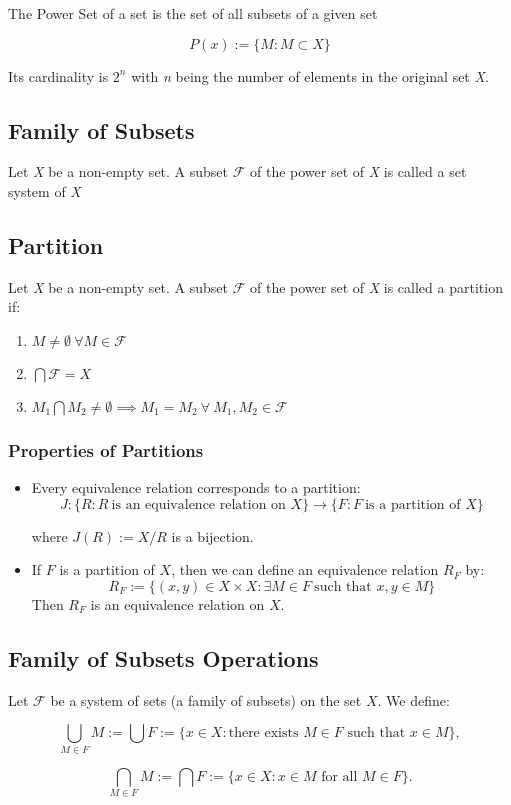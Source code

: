The Power Set of a set is the set of all subsets of a given set 

\[
	P(x):= \{ M: M \subset X\}
\]

Its cardinality is \(2^n\) with \emph{n} being the number of elements in the original set \emph{X}.

\subsection{Family of Subsets}

Let \emph{X} be a non-empty set. A subset \(\mathscr{F}\) of the power set of \emph{X} is called a set system of \emph{X}

\subsection{Partition}

Let \emph{X} be a non-empty set. A subset \(\mathscr{F}\) of the power set of \emph{X} is called a partition if:

\begin{enumerate}
	\item \(M \neq  \emptyset\ \forall M \in \mathscr{F}\)
    \item \(\bigcap \mathscr{F} = X\)
    \item \(M_1 \bigcap M_2 \ne \emptyset \implies M_1 = M_2\ \forall\ M_1, M_2 \in \mathscr{F} \) 
\end{enumerate}

\subsubsection{Properties of Partitions}

\begin{itemize}

	\item Every equivalence relation corresponds to a partition:
	      \[
		      J: \{ R : R\ \text{is an equivalence relation on } X\} \to \{ F: F\ \text{is a partition of } X\}
	      \]

	      where \( J(R) := X / R \) is a bijection.

	\item If \( F \) is a partition of \( X \), then we can define an equivalence relation \( R_F \) by:
	      \[
		      R_F := \{ (x, y) \in X \times X : \exists M \in F\ \text{such that } x, y \in M \}
	      \]
	      Then \( R_F \) is an equivalence relation on \( X \).

\end{itemize}


\subsection{Family of Subsets Operations}

Let \(\mathscr{F}\) be a system of sets (a family of subsets) on the set \( X \). We define:

\[
	\bigcup_{M \in F} M := \bigcup F := \{ x \in X : \text{there exists } M \in F \text{ such that } x \in M \} ,
\]

\[
	\bigcap_{M \in F} M := \bigcap F := \{ x \in X : x \in M \text{ for all } M \in F \} .
\]